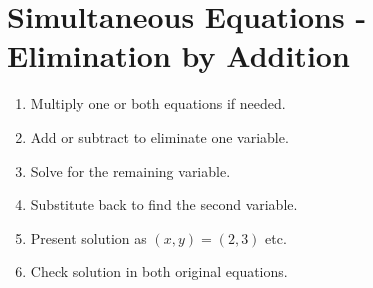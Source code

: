 \documentclass[12pt, a4paper, addpoints]{exam}
\begin{document}
\section*{Simultaneous Equations - Elimination by Addition}

\begin{mdframed}[backgroundcolor=gray!20, roundcorner=5pt] %
\begin{multicols}{2}
\begin{enumerate}
    \item Multiply one or both equations if needed.
    \item Add or subtract to eliminate one variable.
    \item Solve for the remaining variable.
    \item Substitute back to find the second variable.
    \item Present solution as  \((x, y) = (2, 3)\) etc.
    \item Check solution in both original equations.
\end{enumerate}
\end{multicols}
\end{mdframed}

\newcommand{\verticalspace}{\vspace{21mm}} 
\end{document}
